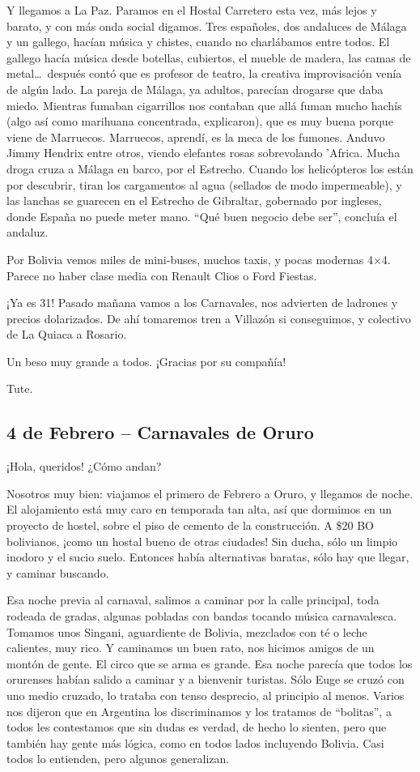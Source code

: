 Y llegamos a La Paz. Paramos en el Hostal Carretero esta vez, más lejos y
barato, y con más onda social digamos. Tres españoles, dos andaluces de
Málaga y un gallego, hacían música y chistes, cuando no charlábamos entre
todos. El gallego hacía música desde botellas, cubiertos, el mueble de madera,
las camas de metal\ldots\ después contó que es profesor de teatro, la creativa
improvisación venía de algún lado. La pareja de Málaga, ya adultos,
parecían drogarse que daba miedo. Mientras fumaban cigarrillos nos contaban que
allá fuman mucho hachís (algo así como marihuana concentrada, explicaron),
que es muy buena porque viene de Marruecos. Marruecos, aprendí, es la meca de
los fumones. Anduvo Jimmy Hendrix entre otros, viendo elefantes rosas
sobrevolando 'Africa. Mucha droga cruza a Málaga en barco, por el Estrecho.
Cuando los helicópteros los están por descubrir, tiran los cargamentos al agua
(sellados de modo impermeable), y las lanchas se guarecen en el Estrecho de
Gibraltar, gobernado por ingleses, donde España no puede meter mano. ``Qué
buen negocio debe ser'', concluía el andaluz.

Por Bolivia vemos miles de mini-buses, muchos taxis, y pocas modernas
4$\times$4. Parece no haber clase media con Renault Clios o Ford Fiestas.

¡Ya es 31! Pasado mañana vamos a los Carnavales, nos advierten
de ladrones y precios dolarizados. De ahí tomaremos tren a Villazón si
conseguimos, y colectivo de La Quiaca a Rosario.

Un beso muy grande a todos. ¡Gracias por su compañía!

Tute.

\subsection*{4 de Febrero -- Carnavales de Oruro}

¡Hola, queridos! ¿Cómo andan?

Nosotros muy bien: viajamos el primero de Febrero a Oruro, y llegamos de noche.
El alojamiento está muy caro en temporada tan alta, así que dormimos en un
proyecto de hostel, sobre el piso de cemento de la construcción. A \$20{\small
BO} bolivianos, ¡como un hostal bueno de otras ciudades! Sin ducha, sólo un
limpio inodoro y el sucio suelo. Entonces había alternativas baratas, sólo hay
que llegar, y caminar buscando.

Esa noche previa al carnaval, salimos a caminar por la calle principal, toda
rodeada de gradas, algunas pobladas con bandas tocando música carnavalesca.
Tomamos unos Singani, aguardiente de Bolivia, mezclados con té o leche
calientes, muy rico. Y caminamos un buen rato, nos hicimos amigos de un montón
de gente. El circo que se arma es grande. Esa noche parecía que todos los
orurenses habían salido a caminar y a bienvenir turistas. Sólo Euge se cruzó con
uno medio cruzado, lo trataba con tenso desprecio, al principio al menos. Varios
nos dijeron que en Argentina los discriminamos y los tratamos de ``bolitas'', a
todos les contestamos que sin dudas es verdad, de hecho lo sienten, pero que
también hay gente más lógica, como en todos lados incluyendo Bolivia. Casi todos
lo entienden, pero algunos generalizan.


